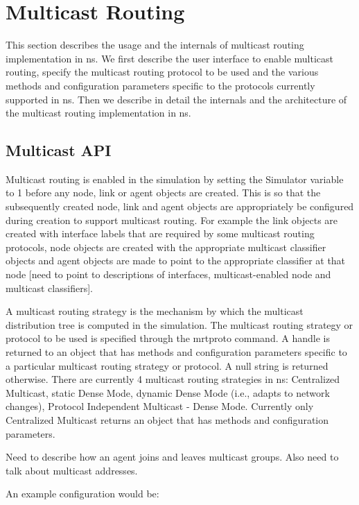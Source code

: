 \chapter{Multicast Routing}
\label{chap:multicast}
This section describes the usage and the internals of multicast
routing implementation in ns.
We first describe the user interface to enable multicast routing,
specify the multicast routing protocol to be used and the
various methods and configuration parameters specific to the
protocols currently supported in ns.
Then we describe in detail the internals and the architecture of the
multicast routing implementation in ns.

\section{Multicast API}
\label{sec:mcast-api}
Multicast routing is enabled in the simulation by setting 
the  Simulator variable to 1
before any node, link or agent objects are created.
This is so that the subsequently created 
node, link and agent objects are appropriately
be configured during creation to support multicast routing.
For example the link objects are created with interface labels that
are required by some multicast routing protocols, 
node objects are created with the 
appropriate multicast classifier objects
and agent objects are made to point to the 
appropriate classifier at that node
[need to point to descriptions of interfaces, multicast-enabled node
and multicast classifiers].

A multicast routing strategy is the mechanism by which
the multicast distribution tree
is computed in the simulation.
The multicast routing strategy or protocol
to be used is specified through the mrtproto command.
A handle is returned to an object that has 
methods and configuration parameters specific to a
particular multicast routing strategy or protocol.
A null string is returned otherwise.
There are currently 4 multicast routing strategies in ns: Centralized
Multicast, static Dense Mode, dynamic Dense Mode (i.e., adapts to
network changes), Protocol Independent Multicast - Dense Mode.
Currently only Centralized Multicast returns an object that has
methods and configuration parameters.

Need to describe how an agent joins and leaves multicast groups.
Also need to talk about multicast addresses.

An example configuration would be:


